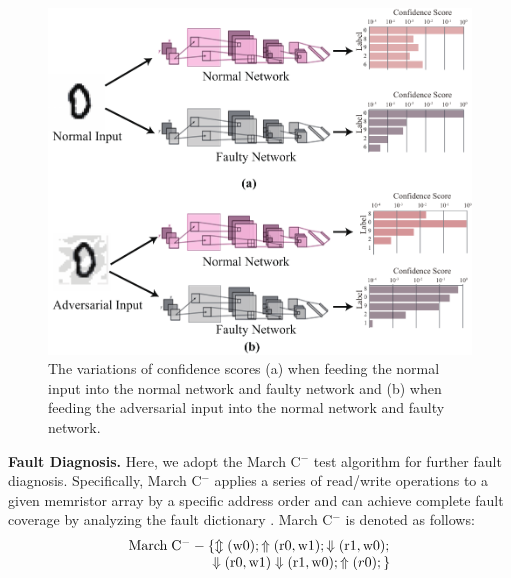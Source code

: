 \begin{figure}[b] 
    \centering
    \includegraphics[width=0.8\linewidth]{images/OL-fig6}
    \caption{ The variations of confidence scores (a) when feeding the normal input into the normal network and faulty network and (b) when feeding the adversarial input into the normal network and faulty network.}
    \label{fig:detection-mnist}
\end{figure}
                                                                                                                                                                                                                                                                        
{\bf Fault Diagnosis.} Here, we adopt the March C${^-}$ test algorithm for further fault diagnosis.  Specifically, March C${^-}$ applies a series of read/write operations to a given memristor array by a specific address order and can achieve complete fault coverage by analyzing the fault dictionary \cite{Wang2006VLSI}. March C${^-}$ is denoted as follows:                                                                                                                                                                                                                                                               
\begin{equation}
    \begin{array}{*{20}{l}}{\rm{March}}\;{{\rm{C}}^ - } - \{  \Updownarrow ({\rm{w0}}); \Uparrow ({\rm{r0}},{\rm{w1}}); \Downarrow ({\rm{r1}},{\rm{w0}}); \\ \qquad \qquad \qquad \Downarrow ({\rm{r0}},{\rm{w1}}) \Downarrow ({\rm{r1}},{\rm{w0}}); \Uparrow (r0);\} 
    \end{array}
\end{equation}
                                                                                                                                                                                                                                                                                                                                
